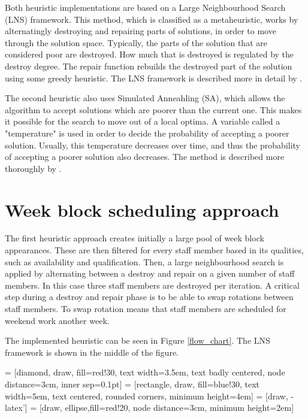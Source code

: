 Both heuristic implementations are based on a Large Neighbourhood Search (LNS) framework. This method, which is classified as a metaheuristic, works by alternatingly destroying and repairing parts of solutions, in order to move through the solution space. Typically, the parts of the solution that are considered poor are destroyed. How much that is destroyed is regulated by the destroy degree. The repair function rebuilds the destroyed part of the solution using some greedy heuristic. The LNS framework is described more in detail by \citet{pisinger_2010}. 

The second heuristic also uses Simulated Anneahling (SA), which allows the algorithm to accept solutions which are poorer than the current one. This makes it possible for the search to move out of a local optima. A variable called a "temperature" is used in order to decide the probability of accepting a poorer solution. Usually, this temperature decreases over time, and thus the probability of accepting a poorer solution also decreases. The method is described more thoroughly by \citet{pisinger_2010}.

\section{Week block scheduling approach}

The first heuristic approach creates initially a large pool of week block appearances. These are then filtered for every staff member based in its qualities, such as availability and qualification. Then, a large neighbourhood search is applied by alternating between a destroy and repair on a given number of staff members. In this case three staff members are destroyed per iteration. A critical step during a destroy and repair phase is to be able to swap rotations between staff members. To swap rotation means that staff members are scheduled for weekend work another week.

The implemented heuristic can be seen in Figure \ref{flow_chart}. The LNS framework is shown in the middle of the figure.

 = [diamond, draw, fill=red!30,
    text width=3.5em, text badly centered, node distance=3cm, inner sep=0.1pt]
 = [rectangle, draw, fill=blue!30,
    text width=5em, text centered, rounded corners, minimum height=4em]
 = [draw, -latex']
 = [draw, ellipse,fill=red!20, node distance=3cm,
    minimum height=2em]


